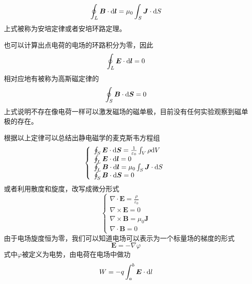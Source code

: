 \documentclass[UTF8,a4paper,10pt]{ctexart}
\begin{document}
\begin{multicols}{2}
        \begin{equation}
            \oint_L\bm{B}\cdot{\rm d}\bm{l} = \mu_0\int_S\bm{J}\cdot{\rm d}S
        \end{equation}
        上式被称为安培定律或者安培环路定理。\par
        也可以计算出点电荷的电场的环路积分为零，因此
        \begin{equation}
            \oint_L\bm{E}\cdot{\rm d}\bm{l} = 0
        \end{equation}
        相对应地有被称为高斯磁定律的
        \begin{equation}
            \oint_S\bm{B}\cdot{\rm d}\bm{S} = 0
        \end{equation}
        上式说明不存在像电荷一样可以激发磁场的磁单极，目前没有任何实验观察到磁单极的存在。\par
        根据以上定律可以总结出静电磁学的麦克斯韦方程组
        \begin{equation}
            \left\{\begin{array}{l}
                \oint_S\bm{E}\cdot{\rm d}\bm{S} = \frac{1}{\varepsilon_0}\int_V\rho{\rm d}V\\
                \oint_L\bm{E}\cdot{\rm d}\bm{l} = 0\\
                \oint_L\bm{B}\cdot{\rm d}\bm{l} = \mu_0\int_S\bm{J}\cdot{\rm d}S\\
                \oint_S\bm{B}\cdot{\rm d}\bm{S} = 0
            \end{array}\right.
        \end{equation}
        或者利用散度和旋度，改写成微分形式
        \begin{equation}
            \left\{\begin{array}{l}
                \nabla\cdot\bm{E} = \frac{\rho}{\varepsilon_0}\\
                \nabla\times\bm{E} = 0\\
                \nabla\times\bm{B} = \mu_0\bm{J}\\
                \nabla\cdot\bm{B} = 0
            \end{array}\right.
        \end{equation}
        由于电场旋度恒为零，我们可以知道电场可以表示为一个标量场的梯度的形式
        \begin{equation}
            \bm{E} = -\nabla\varphi
        \end{equation}
        式中$\varphi$被定义为电势，由电荷在电场中做功
        \begin{equation}
            W = -q\int_a^b\bm{E}\cdot{\rm d}l

\end{equation}
\end{multicols}
\end{document}
